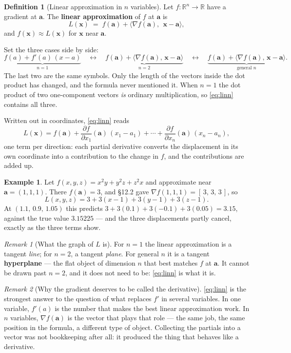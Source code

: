 \documentclass[11pt]{article}
\theoremstyle{plain}
\theoremstyle{definition}
\newtheorem{defn}{Definition}[section]
\newtheorem{ex}{Example}[section]
\theoremstyle{remark}
\newtheorem*{rmk}{Remark}
\newcommand{\R}{\mathbb{R}}
\newcommand{\vc}[1]{\mathbf{#1}}
\newcommand{\ip}[2]{\langle #1,\, #2\rangle}
\newcommand{\grad}{\nabla}
\newcommand{\pd}[2]{\frac{\partial #1}{\partial #2}}
\begin{document}
\begin{defn}[Linear approximation in $n$ variables]
Let $f:\R^{n}\to\R$ have a gradient at $\vc{a}$. The \textbf{linear
approximation} of $f$ at $\vc{a}$ is
\begin{equation}\label{eq:linn}
  L(\vc{x}) \;=\; f(\vc{a}) + \ip{\grad f(\vc{a})}{\;\vc{x}-\vc{a}} ,
\end{equation}
and $f(\vc{x})\approx L(\vc{x})$ for $\vc{x}$ near $\vc{a}$.
\end{defn}

\noindent Set the three cases side by side:
\[
  \underbrace{f(a) + f'(a)\,(x-a)}_{n=1}
  \quad\longleftrightarrow\quad
  \underbrace{f(\vc{a}) + \ip{\grad f(\vc{a})}{\vc{x}-\vc{a}}}_{n=2}
  \quad\longleftrightarrow\quad
  \underbrace{f(\vc{a}) + \ip{\grad f(\vc{a})}{\vc{x}-\vc{a}}}_{\text{general } n} .
\]
The last two are the same symbols. Only the length of the vectors inside the dot
product has changed, and the formula never mentioned it. When $n=1$ the dot
product of two one-component vectors \emph{is} ordinary multiplication, so
\eqref{eq:linn} contains all three.

Written out in coordinates, \eqref{eq:linn} reads
\[
  L(\vc{x}) = f(\vc{a})
    + \pd{f}{x_1}(\vc{a})\,(x_1-a_1)
    + \cdots
    + \pd{f}{x_n}(\vc{a})\,(x_n-a_n) ,
\]
one term per direction: each partial derivative converts the displacement in its
own coordinate into a contribution to the change in $f$, and the contributions
are added up.

\begin{ex}
Let $f(x,y,z)=x^{2}y+y^{2}z+z^{2}x$ and approximate near $\vc{a}=(1,1,1)$. There
$f(\vc{a})=3$, and \S12.2 gave $\grad f(1,1,1)=[\,3,\,3,\,3\,]$, so
\[
  L(x,y,z) = 3 + 3(x-1) + 3(y-1) + 3(z-1) .
\]
At $(1.1,\,0.9,\,1.05)$ this predicts $3 + 3(0.1) + 3(-0.1) + 3(0.05) = 3.15$,
against the true value $3.15225$ --- and the three displacements partly
cancel, exactly as the three terms show.
\end{ex}

\begin{rmk}[What the graph of $L$ is]
For $n=1$ the linear approximation is a tangent \emph{line}; for $n=2$, a
tangent \emph{plane}. For general $n$ it is a tangent \textbf{hyperplane} --- the
flat object of dimension $n$ that best matches $f$ at $\vc{a}$. It cannot be
drawn past $n=2$, and it does not need to be: \eqref{eq:linn} is what it is.
\end{rmk}

\begin{rmk}[Why the gradient deserves to be called the derivative]
\eqref{eq:linn} is the strongest answer to the question of what replaces $f'$ in
several variables. In one variable, $f'(a)$ is the number that makes the best
linear approximation work. In $n$ variables, $\grad f(\vc{a})$ is the vector that
plays that role --- the same job, the same position in the formula, a different
type of object. Collecting the partials into a vector was not bookkeeping after
all: it produced the thing that behaves like a derivative.
\end{rmk}
\end{document}
